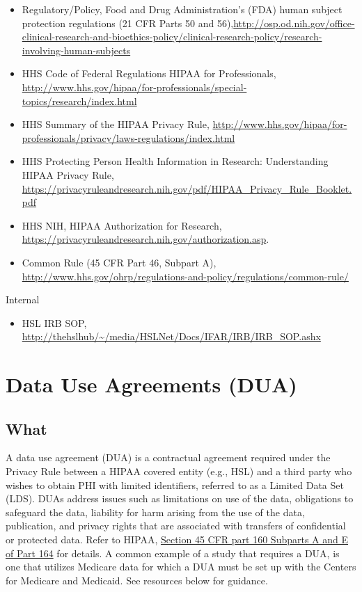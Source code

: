 \documentclass[]{book}
\providecommand{\tightlist}{%
  \setlength{\itemsep}{0pt}\setlength{\parskip}{0pt}}
\theoremstyle{definition}
\theoremstyle{definition}
\theoremstyle{definition}
\theoremstyle{remark}
\begin{document}
\begin{itemize}
\tightlist
\item
  Regulatory/Policy, Food and Drug Administration's (FDA) human subject
  protection regulations (21 CFR Parts 50 and
  56),\url{http://osp.od.nih.gov/office-clinical-research-and-bioethics-policy/clinical-research-policy/research-involving-human-subjects}
\item
  HHS Code of Federal Regulations HIPAA for Professionals,
  \url{http://www.hhs.gov/hipaa/for-professionals/special-topics/research/index.html}
\item
  HHS Summary of the HIPAA Privacy Rule,
  \url{http://www.hhs.gov/hipaa/for-professionals/privacy/laws-regulations/index.html}
\item
  HHS Protecting Person Health Information in Research: Understanding
  HIPAA Privacy Rule,
  \url{https://privacyruleandresearch.nih.gov/pdf/HIPAA_Privacy_Rule_Booklet.pdf}
\item
  HHS NIH, HIPAA Authorization for Research,
  \url{https://privacyruleandresearch.nih.gov/authorization.asp}.
\item
  Common Rule (45 CFR Part 46, Subpart A),
  \url{http://www.hhs.gov/ohrp/regulations-and-policy/regulations/common-rule/}
\end{itemize}

Internal

\begin{itemize}
\tightlist
\item
  HSL IRB SOP,
  \url{http://thehslhub/~/media/HSLNet/Docs/IFAR/IRB/IRB_SOP.ashx}
\end{itemize}

\section{Data Use Agreements (DUA)}\label{data-use-agreements-dua}

\subsection{What}\label{what-7}

A data use agreement (DUA) is a contractual agreement required under the
Privacy Rule between a HIPAA covered entity (e.g., HSL) and a third
party who wishes to obtain PHI with limited identifiers, referred to as
a Limited Data Set (LDS). DUAs address issues such as limitations on use
of the data, obligations to safeguard the data, liability for harm
arising from the use of the data, publication, and privacy rights that
are associated with transfers of confidential or protected data. Refer
to HIPAA,
\href{http://www.hhs.gov/ocio/eplc/EPLC\%20Archive\%20Documents/55-Data\%20Use\%20Agreement\%20(DUA)/eplc_dua_practices_guide.pdf}{Section
45 CFR part 160 Subparts A and E of Part 164} for details. A common
example of a study that requires a DUA, is one that utilizes Medicare
data for which a DUA must be set up with the Centers for Medicare and
Medicaid. See resources below for guidance.
\end{document}
